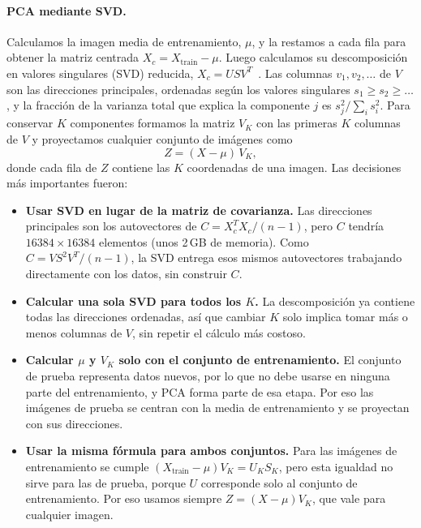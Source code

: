 \documentclass[11pt,a4paper]{article}
\begin{document}
\paragraph{PCA mediante SVD.} Calculamos la imagen media de entrenamiento, $\mu$, y la restamos a cada fila
para obtener la matriz centrada $X_c = X_{\text{train}} - \mu$. Luego calculamos su descomposición en
valores singulares (SVD) reducida, $X_c = U S V^T$~\cite{teoricas}. Las columnas $v_1, v_2, \dots$ de $V$
son las direcciones principales, ordenadas según los valores singulares $s_1 \ge s_2 \ge \dots$, y la
fracción de la varianza total que explica la componente $j$ es $s_j^2/\sum_i s_i^2$. Para conservar $K$
componentes formamos la matriz $V_K$ con las primeras $K$ columnas de $V$ y proyectamos cualquier conjunto
de imágenes como
\[ Z = (X - \mu)\,V_K , \]
donde cada fila de $Z$ contiene las $K$ coordenadas de una imagen. Las decisiones más importantes fueron:
\begin{itemize}
  \item \textbf{Usar SVD en lugar de la matriz de covarianza.} Las direcciones principales son los
        autovectores de $C = X_c^TX_c/(n-1)$, pero $C$ tendría $16384\times16384$ elementos (unos 2\,GB de
        memoria). Como $C = VS^2V^T/(n-1)$, la SVD entrega esos mismos autovectores trabajando directamente
        con los datos, sin construir $C$.
  \item \textbf{Calcular una sola SVD para todos los $K$.} La descomposición ya contiene todas las
        direcciones ordenadas, así que cambiar $K$ solo implica tomar más o menos columnas de $V$, sin
        repetir el cálculo más costoso.
  \item \textbf{Calcular $\mu$ y $V_K$ solo con el conjunto de entrenamiento.} El conjunto de prueba
        representa datos nuevos, por lo que no debe usarse en ninguna parte del entrenamiento, y PCA forma
        parte de esa etapa. Por eso las imágenes de prueba se centran con la media de entrenamiento y se
        proyectan con sus direcciones.
  \item \textbf{Usar la misma fórmula para ambos conjuntos.} Para las imágenes de entrenamiento se cumple
        $(X_{\text{train}}-\mu)V_K = U_KS_K$, pero esta igualdad no sirve para las de prueba, porque $U$
        corresponde solo al conjunto de entrenamiento. Por eso usamos siempre $Z=(X-\mu)V_K$, que vale para
        cualquier imagen.
\end{itemize}
\end{document}

